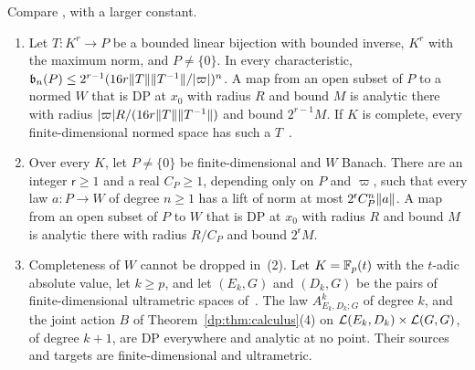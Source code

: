 Compare \cite[Theorem~14.39(3) and Proposition~14.40(2)]{I}, with a larger constant.

\begin{theorem}\label{dp:thm:agreement-finite}
\leavevmode
\begin{enumerate}
\item Let $T\colon K^r\to P$ be a bounded linear bijection with bounded inverse, $K^r$ with the maximum norm, and $P\ne\{0\}$. In every characteristic, $\mathfrak b_n(P)\le2^{r-1}(16r\lVert T\rVert\lVert T^{-1}\rVert/\lvert \varpi\rvert)^n$. A map from an open subset of $P$ to a normed $W$ that is DP at $x_0$ with radius $R$ and bound $M$ is analytic there with radius $\lvert \varpi\rvert R/(16r\lVert T\rVert\lVert T^{-1}\rVert)$ and bound $2^{r-1}M$. If $K$ is complete, every finite-dimensional normed space has such a $T$~\cite[Lemma~A.3]{I}.
\item Over every $K$, let $P\ne\{0\}$ be finite-dimensional and $W$ Banach. There are an integer $\mathsf r\ge1$ and a real $C_P\ge1$, depending only on $P$ and $\varpi$, such that every law $a\colon P\to W$ of degree $n\ge1$ has a lift of norm at most $2^{\mathsf r}C_P^n\lVert a\rVert$. A map from an open subset of $P$ to $W$ that is DP at $x_0$ with radius $R$ and bound $M$ is analytic there with radius $R/C_P$ and bound $2^{\mathsf r}M$.
\item Completeness of $W$ cannot be dropped in~\textup{(2)}. Let $K=\mathbb F_p(t)$ with the $t$-adic absolute value, let $k\ge p$, and let $(E_k,G)$ and $(D_k,G)$ be the pairs of finite-dimensional ultrametric spaces of~\cite[Theorem~H.4]{I}. The law $A^k_{E_k,D_k;G}$ of degree $k$, and the joint action $B$ of Theorem~\ref{dp:thm:calculus}(4) on $\mathcal L(E_k,D_k)\times\mathcal L(G,G)$, of degree $k+1$, are DP everywhere and analytic at no point. Their sources and targets are finite-dimensional and ultrametric.
\end{enumerate}
\end{theorem}

